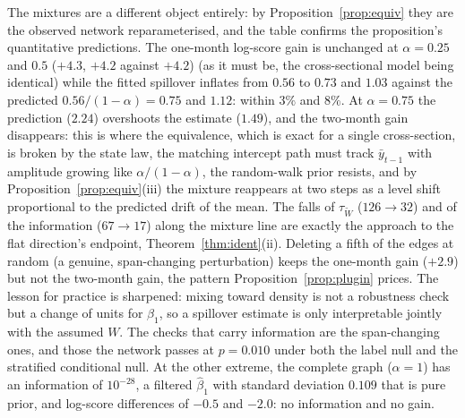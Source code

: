 \documentclass[12pt]{article}
\theoremstyle{plain}
\theoremstyle{definition}
\theoremstyle{remark}
\begin{document}
The mixtures are a different object entirely: by Proposition~\ref{prop:equiv} they are the observed network reparameterised, and the table confirms the proposition's quantitative predictions. The one-month log-score gain is unchanged at $\alpha=0.25$ and $0.5$ ($+4.3$, $+4.2$ against $+4.2$) (as it must be, the cross-sectional model being identical) while the fitted spillover inflates from $0.56$ to $0.73$ and $1.03$ against the predicted $0.56/(1-\alpha)=0.75$ and $1.12$: within $3\%$ and $8\%$. At $\alpha=0.75$ the prediction ($2.24$) overshoots the estimate ($1.49$), and the two-month gain disappears: this is where the equivalence, which is exact for a single cross-section, is broken by the state law, the matching intercept path must track $\bar y_{t-1}$ with amplitude growing like $\alpha/(1-\alpha)$, the random-walk prior resists, and by Proposition~\ref{prop:equiv}(iii) the mixture reappears at two steps as a level shift proportional to the predicted drift of the mean. The falls of $\tau_{\widetilde W}$ ($126\to32$) and of the information ($67\to17$) along the mixture line are exactly the approach to the flat direction's endpoint, Theorem~\ref{thm:ident}(ii). Deleting a fifth of the edges at random (a genuine, span-changing perturbation) keeps the one-month gain ($+2.9$) but not the two-month gain, the pattern Proposition~\ref{prop:plugin} prices. The lesson for practice is sharpened: mixing toward density is not a robustness check but a change of units for $\beta_1$, so a spillover estimate is only interpretable jointly with the assumed $W$. The checks that carry information are the span-changing ones, and those the network passes at $p=0.010$ under both the label null and the stratified conditional null. At the other extreme, the complete graph ($\alpha=1$) has an information of $10^{-28}$, a filtered $\hat\beta_1$ with standard deviation $0.109$ that is pure prior, and log-score differences of $-0.5$ and $-2.0$: no information and no gain.
\end{document}
